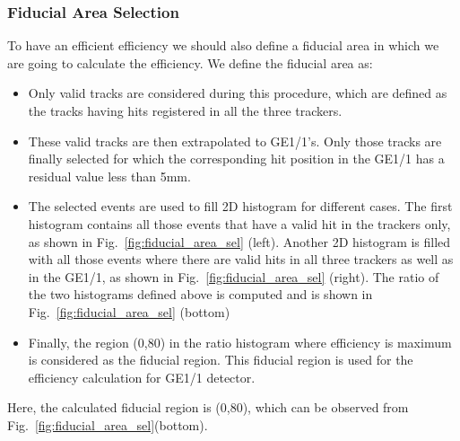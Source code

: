 \subsubsection{Fiducial Area Selection} %
\label{ssub:fiducial_area_selection}
To have an efficient efficiency we should also define a fiducial area in which we are going to calculate the efficiency. We define the fiducial area as:
\begin{itemize}
        \item Only valid tracks are considered during this procedure, which are defined as the tracks having hits registered in all the three trackers.
        \item These valid tracks are then extrapolated to GE1/1’s. Only those tracks are finally selected for which the corresponding hit position in the GE1/1 has a residual value less than 5mm.
        \item The selected events are used to fill 2D histogram for different cases. The first histogram contains all those events that have a valid hit in the trackers only, as shown in Fig.~\ref{fig:fiducial_area_sel} (left). Another 2D histogram is filled with all those events where there are valid hits in all three trackers as well as in the GE1/1, as shown in Fig.~\ref{fig:fiducial_area_sel} (right). The ratio of the two histograms defined above is computed and is shown in Fig.~\ref{fig:fiducial_area_sel} (bottom)
        \item Finally, the region (0,80) in the ratio histogram where efficiency is maximum is considered as the fiducial region. This fiducial region is used for the efficiency calculation for GE1/1 detector.
\end{itemize}
Here, the calculated fiducial region is (0,80), which can be observed from Fig.~\ref{fig:fiducial_area_sel}(bottom).
